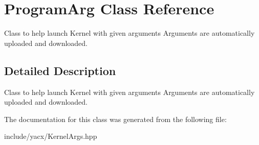 \hypertarget{class_program_arg}{}\section{Program\+Arg Class Reference}
\label{class_program_arg}


Class to help launch Kernel with given arguments Arguments are automatically uploaded and downloaded.  




\subsection{Detailed Description}
Class to help launch Kernel with given arguments Arguments are automatically uploaded and downloaded. 

The documentation for this class was generated from the following file\+:\begin{DoxyCompactItemize}
\item 
include/yacx/Kernel\+Args.\+hpp\end{DoxyCompactItemize}
